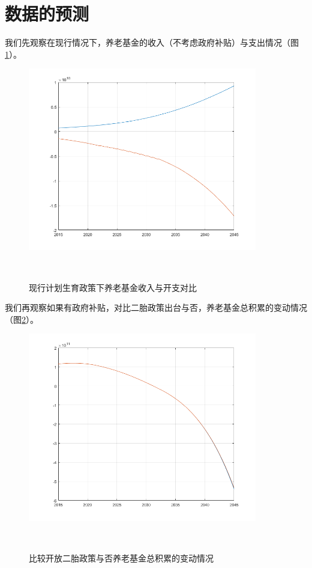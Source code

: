 \documentclass[a4paper]{article}
\begin{document}
\section{数据的预测}
我们先观察在现行情况下，养老基金的收入（不考虑政府补贴）与支出情况（图\ref{pension_io}）。
	\begin{figure}[htbp]
		\centering
		\includegraphics[width=10cm]{pics/pension_io.png}
		\caption{现行计划生育政策下养老基金收入与开支对比} 
		 \\
		\label{pension_io}	
	\end{figure}
我们再观察如果有政府补贴，对比二胎政策出台与否，养老基金总积累的变动情况（图\ref{pension_accu}）。
	\begin{figure}[htbp]
		\centering
		\includegraphics[width=10cm]{pics/pension_accu.png}
		\caption{比较开放二胎政策与否养老基金总积累的变动情况} 
		 \\
		\label{pension_accu}	
	\end{figure}
\end{document}
